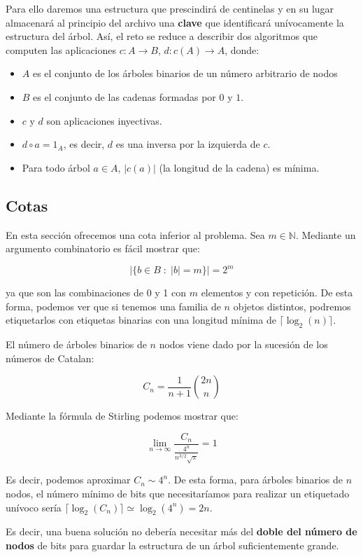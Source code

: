 \documentclass{article}
\begin{document}
Para ello daremos una estructura que prescindirá de centinelas y en su lugar
almacenará al principio del archivo una \textbf{clave} que identificará
unívocamente la estructura del árbol. Así, el reto se reduce a describir dos
algoritmos que computen las aplicaciones $c: A \to B$, $d: c(A) \to A$, donde:

\begin{itemize}
	\item $A$ es el conjunto de los árboles binarios de un número arbitrario de nodos
	\item $B$ es el conjunto de las cadenas formadas por $0$ y $1$.
	\item $c$ y $d$ son aplicaciones inyectivas.
	\item $d \circ a = 1_A$, es decir, $d$ es una inversa por la izquierda de $c$.
	\item Para todo árbol $a \in A$, $|c(a)|$ (la longitud de la cadena) es mínima.
\end{itemize}

\subsection{Cotas}

En esta sección ofrecemos una cota inferior al problema. Sea $m \in \mathbb{N}$.
Mediante un argumento combinatorio es fácil mostrar que:

\[|\{b \in B\; : \; |b| = m\}| = 2^m\]

ya que son las combinaciones de 0 y 1 con $m$ elementos y con repetición. De esta
forma, podemos ver que si tenemos una familia de $n$ objetos distintos, podremos
etiquetarlos con etiquetas binarias con una longitud mínima de
$\lceil \log_2(n) \rceil$.

El número de árboles binarios de $n$ nodos viene dado por la sucesión de los números
de Catalan:

\[C_n = \frac{1}{n+1} {2n\choose n} \]

Mediante la fórmula de Stirling podemos mostrar que:

\[\lim_{n \to \infty} \frac{C_n}{\frac{4^n}{n^{3/2}\sqrt{\pi}}} = 1\]

Es decir, podemos aproximar $C_n \sim 4^n$. De esta forma, para árboles binarios
de $n$ nodos, el número mínimo de bits que necesitaríamos para realizar un
etiquetado unívoco sería $\lceil \log_2(C_n) \rceil \simeq \log_2(4^n) = 2n$.

Es decir, una buena solución no debería necesitar más del
\textbf{doble del número de nodos} de bits para guardar la estructura de un
árbol suficientemente grande.
\end{document}
